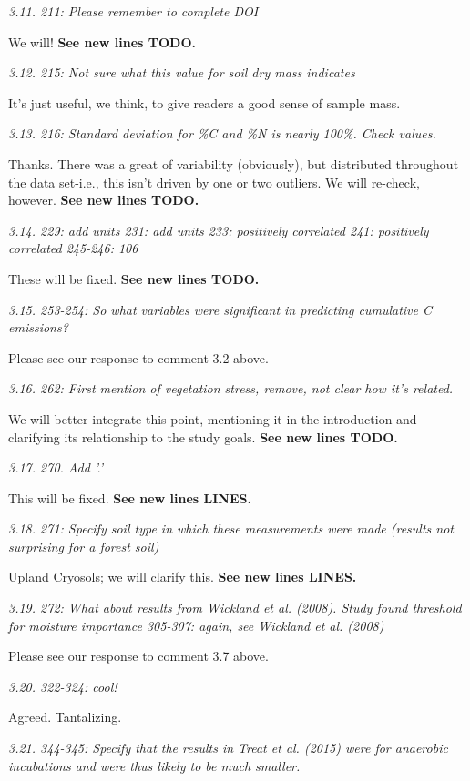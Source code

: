 \documentclass[11pt, oneside]{article}
\begin{document}
\medskip
{\it 3.11. 211: Please remember to complete DOI }

We will! {\bf See new lines TODO.}

\medskip
{\it 3.12. 215: Not sure what this value for soil dry mass indicates }

It's just useful, we think, to give readers a good sense of sample mass.

\medskip
{\it 3.13. 216: Standard deviation for \%C and \%N is nearly 100\%. Check values. }

Thanks. There was a great of variability (obviously), but distributed throughout the data set-i.e., this isn't driven by one or two outliers. We will re-check, however. {\bf See new lines TODO.}

\medskip
{\it 3.14. 229: add units
231: add units
233: positively correlated
241: positively correlated
245-246: 106 }

These will be fixed. {\bf See new lines TODO.}

\medskip
{\it 3.15. 253-254: So what variables were significant in predicting cumulative C emissions? }

Please see our response to comment 3.2 above.

\medskip
{\it 3.16. 262: First mention of vegetation stress, remove, not clear how it's related. }

We will better integrate this point, mentioning it in the introduction and clarifying its relationship to the study goals. {\bf See new lines TODO.}

\medskip
{\it 3.17. 270. Add '.' }

This will be fixed. {\bf See new lines LINES.}

\medskip
{\it 3.18. 271: Specify soil type in which these measurements were made (results not surprising for a forest soil) }

Upland Cryosols; we will clarify this. {\bf See new lines LINES.}

\medskip
{\it 3.19. 272: What about results from Wickland et al. (2008). Study found threshold for moisture importance
305-307: again, see Wickland et al. (2008) }

Please see our response to comment 3.7 above.

\medskip
{\it 3.20. 322-324: cool! }

Agreed. Tantalizing.

\medskip
{\it 3.21. 344-345: Specify that the results in Treat et al. (2015) were for anaerobic incubations and were thus likely to be much smaller. }
\end{document}
